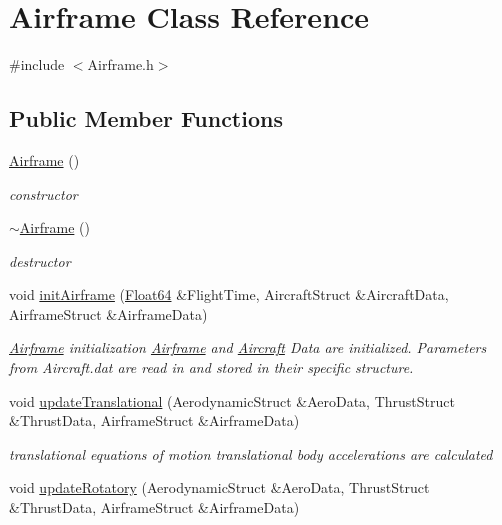 \hypertarget{class_airframe}{}\section{Airframe Class Reference}
\label{class_airframe}


{\ttfamily \#include $<$Airframe.\+h$>$}

\subsection*{Public Member Functions}
\begin{DoxyCompactItemize}
\item 
\hyperlink{class_airframe_a5e6632c7d0c5bc5b889de6cc2407944f}{Airframe} ()
\begin{DoxyCompactList}\small\item\em constructor \end{DoxyCompactList}\item 
\hyperlink{class_airframe_af849116afbf7c4d7d2d5c189ff68cb7d}{$\sim$\+Airframe} ()
\begin{DoxyCompactList}\small\item\em destructor \end{DoxyCompactList}\item 
void \hyperlink{class_airframe_ad7e530da939683d17010262d0fee76ca}{init\+Airframe} (\hyperlink{group___tools_ga3f1431cb9f76da10f59246d1d743dc2c}{Float64} \&Flight\+Time, Aircraft\+Struct \&Aircraft\+Data, Airframe\+Struct \&Airframe\+Data)
\begin{DoxyCompactList}\small\item\em \hyperlink{class_airframe}{Airframe} initialization \hyperlink{class_airframe}{Airframe} and \hyperlink{class_aircraft}{Aircraft} Data are initialized. Parameters from Aircraft.\+dat are read in and stored in their specific structure. \end{DoxyCompactList}\item 
void \hyperlink{class_airframe_a29b3a2854700f77468b6a94c5b7d0372}{update\+Translational} (Aerodynamic\+Struct \&Aero\+Data, Thrust\+Struct \&Thrust\+Data, Airframe\+Struct \&Airframe\+Data)
\begin{DoxyCompactList}\small\item\em translational equations of motion translational body accelerations are calculated \end{DoxyCompactList}\item 
void \hyperlink{class_airframe_a93b66b243b961518c207192c912cc6f2}{update\+Rotatory} (Aerodynamic\+Struct \&Aero\+Data, Thrust\+Struct \&Thrust\+Data, Airframe\+Struct \&Airframe\+Data)

\end{DoxyCompactItemize}
